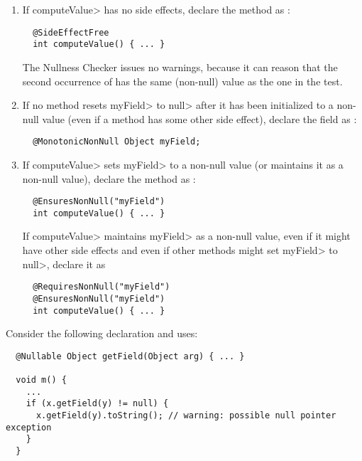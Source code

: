 \begin{enumerate}
\item
  If \<computeValue> has no side effects, declare the method as
  :

\begin{Verbatim}
  @SideEffectFree
  int computeValue() { ... }
\end{Verbatim}

\noindent
The Nullness Checker issues no warnings, because it can reason that
the second occurrence of  has the same (non-null) value as
the one in the test.

\item
  If no method resets \<myField> to \<null> after it has been initialized
  to a non-null value (even if a method has some other side effect),
  declare the field as :

\begin{Verbatim}
  @MonotonicNonNull Object myField;
\end{Verbatim}

\item
  If \<computeValue> sets \<myField> to a non-null value (or maintains it
  as a non-null value), declare the method as
  :

\begin{Verbatim}
  @EnsuresNonNull("myField")
  int computeValue() { ... }
\end{Verbatim}

  If \<computeValue> maintains \<myField> as a non-null value, even if it
  might have other side effects and even if other methods might set
  \<myField> to \<null>, declare it as

\begin{Verbatim}
  @RequiresNonNull("myField")
  @EnsuresNonNull("myField")
  int computeValue() { ... }
\end{Verbatim}
\end{enumerate}



Consider the following declaration and uses:

\begin{Verbatim}
  @Nullable Object getField(Object arg) { ... }

  void m() {
    ...
    if (x.getField(y) != null) {
      x.getField(y).toString(); // warning: possible null pointer exception
    }
  }
\end{Verbatim}

